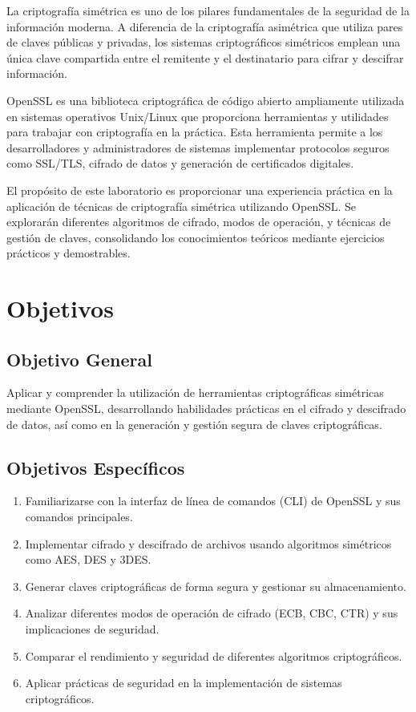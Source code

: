 \documentclass[11pt,a4paper]{article}
\begin{document}
La criptografía simétrica es uno de los pilares fundamentales de la seguridad de la información moderna. A diferencia de la criptografía asimétrica que utiliza pares de claves públicas y privadas, los sistemas criptográficos simétricos emplean una única clave compartida entre el remitente y el destinatario para cifrar y descifrar información.

OpenSSL es una biblioteca criptográfica de código abierto ampliamente utilizada en sistemas operativos Unix/Linux que proporciona herramientas y utilidades para trabajar con criptografía en la práctica. Esta herramienta permite a los desarrolladores y administradores de sistemas implementar protocolos seguros como SSL/TLS, cifrado de datos y generación de certificados digitales.

El propósito de este laboratorio es proporcionar una experiencia práctica en la aplicación de técnicas de criptografía simétrica utilizando OpenSSL. Se explorarán diferentes algoritmos de cifrado, modos de operación, y técnicas de gestión de claves, consolidando los conocimientos teóricos mediante ejercicios prácticos y demostrables.

\section{Objetivos}

\subsection{Objetivo General}
Aplicar y comprender la utilización de herramientas criptográficas simétricas mediante OpenSSL, desarrollando habilidades prácticas en el cifrado y descifrado de datos, así como en la generación y gestión segura de claves criptográficas.

\subsection{Objetivos Específicos}
\begin{enumerate}[label=\alph*)]
    \item Familiarizarse con la interfaz de línea de comandos (CLI) de OpenSSL y sus comandos principales.
    \item Implementar cifrado y descifrado de archivos usando algoritmos simétricos como AES, DES y 3DES.
    \item Generar claves criptográficas de forma segura y gestionar su almacenamiento.
    \item Analizar diferentes modos de operación de cifrado (ECB, CBC, CTR) y sus implicaciones de seguridad.
    \item Comparar el rendimiento y seguridad de diferentes algoritmos criptográficos.
    \item Aplicar prácticas de seguridad en la implementación de sistemas criptográficos.
\end{enumerate}
\end{document}
